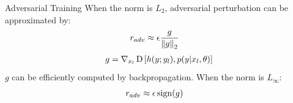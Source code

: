 \begin{frame}{Adversarial Training}
When the norm is $L_2$, adversarial perturbation can be approximated by:
\begin{align*}
r_{adv} &\approx \epsilon \frac{g}{\left\lVert g\right\rVert_2}
\end{align*}
\begin{align*}
g = \nabla_{x_l} \operatorname*{D} \left[h(y ; y_l), p(y | x_l, \theta)\right]\\
\end{align*}
\(g\) can be efficiently computed by backpropagation.
\newline
When the norm is $L_\infty$:
\begin{align*}
r_{adv} &\approx \epsilon \operatorname*{sign}(g)
\end{align*}
\end{frame}

